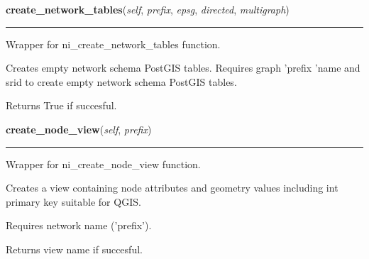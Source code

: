 \hspace{.8\funcindent}\begin{boxedminipage}{\funcwidth}

    \raggedright \textbf{create\_network\_tables}(\textit{self}, \textit{prefix}, \textit{epsg}, \textit{directed}, \textit{multigraph})

    \vspace{-1.5ex}

    \rule{\textwidth}{0.5\fboxrule}
\setlength{\parskip}{2ex}
    Wrapper for ni\_create\_network\_tables function.

    Creates empty network schema PostGIS tables. Requires graph 'prefix 
    'name and srid to create empty network schema PostGIS tables.

    Returns True if succesful.

\setlength{\parskip}{1ex}
    \end{boxedminipage}

    \label{nx_pgnet:nisql:create_node_view}

    \vspace{0.5ex}

\hspace{.8\funcindent}\begin{boxedminipage}{\funcwidth}

    \raggedright \textbf{create\_node\_view}(\textit{self}, \textit{prefix})

    \vspace{-1.5ex}

    \rule{\textwidth}{0.5\fboxrule}
\setlength{\parskip}{2ex}
    Wrapper for ni\_create\_node\_view function.

    Creates a view containing node attributes and geometry values including
    int primary key suitable for QGIS.

    Requires network name ('prefix').

    Returns view name if succesful.

\setlength{\parskip}{1ex}
    \end{boxedminipage}

    \label{nx_pgnet:nisql:create_edge_view}

    \vspace{0.5ex}

